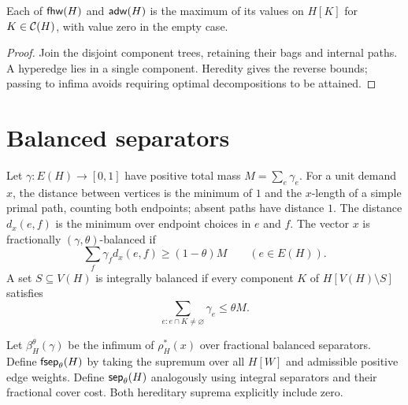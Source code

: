 \begin{lemma}
\label{lem:components}
\leanok
Each of $\mathsf{fhw}(H)$ and $\mathsf{adw}(H)$ is the maximum of its values on $H[K]$ for
$K\in\mathcal C(H)$, with value zero in the empty case.
\end{lemma}
\begin{proof}\leanok
Join the disjoint component trees, retaining their bags and internal paths.
A hyperedge lies in a single component. Heredity gives the reverse bounds;
passing to infima avoids requiring optimal decompositions to be attained.
\end{proof}

\section{Balanced separators}

\begin{definition}
\label{eq:fractional-balance}
\leanok
Let $\gamma:E(H)\to[0,1]$ have positive total mass $M=\sum_e\gamma_e$.
For a unit demand $x$, the distance between vertices is the minimum of $1$
and the $x$-length of a simple primal path, counting both endpoints; absent
paths have distance $1$. The distance $d_x(e,f)$ is the minimum over endpoint
choices in $e$ and $f$.
The vector $x$ is fractionally $(\gamma,\theta)$-balanced if
\[
 \sum_f\gamma_fd_x(e,f)\ge(1-\theta)M \qquad(e\in E(H)).
\]
A set $S\subseteq V(H)$ is integrally balanced if every component $K$ of
$H[V(H)\setminus S]$ satisfies
\[
 \sum_{e:e\cap K\ne\varnothing}\gamma_e\le\theta M.
\]
\end{definition}

\begin{definition}
\label{def:separator-costs}
\leanok
Let $\beta_H^\theta(\gamma)$ be the infimum of $\rho_H^*(x)$ over fractional
balanced separators. Define $\mathsf{fsep}_\theta(H)$ by taking the supremum over
all $H[W]$ and admissible positive edge weights. Define $\mathsf{sep}_\theta(H)$
analogously using integral separators and their fractional cover cost.
Both hereditary suprema explicitly include zero.
\end{definition}

